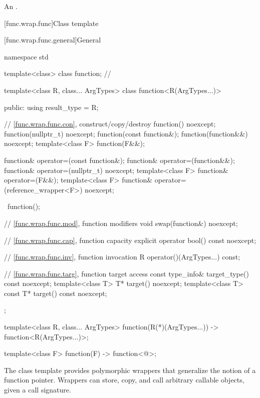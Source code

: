 \begin{itemdescr}
\pnum
\returns
An
 \ntbs{}.
\end{itemdescr}

[func.wrap.func]{Class template }

[func.wrap.func.general]{General}
%

%
\begin{codeblock}
namespace std {
  template<class> class function;       // \notdef

  template<class R, class... ArgTypes>
  class function<R(ArgTypes...)> {
  public:
    using result_type = R;

    // \ref{func.wrap.func.con}, construct/copy/destroy
    function() noexcept;
    function(nullptr_t) noexcept;
    function(const function&);
    function(function&&) noexcept;
    template<class F> function(F&&);

    function& operator=(const function&);
    function& operator=(function&&);
    function& operator=(nullptr_t) noexcept;
    template<class F> function& operator=(F&&);
    template<class F> function& operator=(reference_wrapper<F>) noexcept;

    ~function();

    // \ref{func.wrap.func.mod}, function modifiers
    void swap(function&) noexcept;

    // \ref{func.wrap.func.cap}, function capacity
    explicit operator bool() const noexcept;

    // \ref{func.wrap.func.inv}, function invocation
    R operator()(ArgTypes...) const;

    // \ref{func.wrap.func.targ}, function target access
    const type_info& target_type() const noexcept;
    template<class T>       T* target() noexcept;
    template<class T> const T* target() const noexcept;
  };

  template<class R, class... ArgTypes>
    function(R(*)(ArgTypes...)) -> function<R(ArgTypes...)>;

  template<class F> function(F) -> function<@\seebelow@>;
}
\end{codeblock}

\pnum
The  class template provides polymorphic wrappers that
generalize the notion of a function pointer. Wrappers can store, copy,
and call arbitrary callable objects, given a call
signature.

